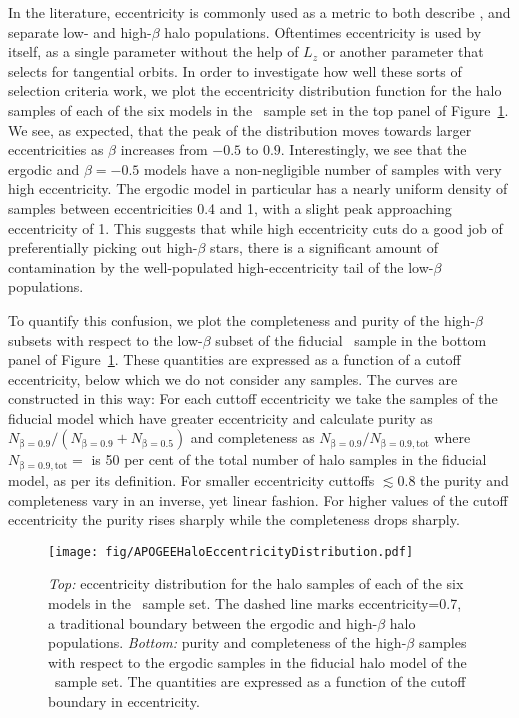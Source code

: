 In the literature, eccentricity is commonly used as a metric to both describe \citep{myeong19,mackereth19a}, and separate \citep{mackereth20,naidu20} low- and high-$\beta$ halo populations. Oftentimes eccentricity is used by itself, as a single parameter without the help of $L_{z}$ or another parameter that selects for tangential orbits. In order to investigate how well these sorts of selection criteria work, we plot the eccentricity distribution function for the halo samples of each of the six models in the \survey\ sample set in the top panel of Figure~\ref{fig:EccentricityDistributions}. We see, as expected, that the peak of the distribution moves towards larger eccentricities as $\beta$ increases from $-0.5$ to $0.9$. Interestingly, we see that the ergodic and $\beta=-0.5$ models have a non-negligible number of samples with very high eccentricity. The ergodic model in particular has a nearly uniform density of samples between eccentricities 0.4 and 1, with a slight peak approaching eccentricity of 1. This suggests that while high eccentricity cuts do a good job of preferentially picking out high-$\beta$ stars, there is a significant amount of contamination by the well-populated high-eccentricity tail of the low-$\beta$ populations.

To quantify this confusion, we plot the completeness and purity of the high-$\beta$ subsets with respect to the low-$\beta$ subset of the fiducial \survey\ sample in the bottom panel of Figure~\ref{fig:EccentricityDistributions}. These quantities are expressed as a function of a cutoff eccentricity, below which we do not consider any samples. The curves are constructed in this way: For each cuttoff eccentricity we take the samples of the fiducial model which have greater eccentricity and calculate purity as $N_\mathrm{\beta=0.9}/(N_\mathrm{\beta=0.9}+N_\mathrm{\beta=0.5})$ and completeness as $N_\mathrm{\beta=0.9}/N_\mathrm{\beta=0.9,tot}$ where $N_\mathrm{\beta=0.9,tot}=$ is 50 per cent of the total number of halo samples in the fiducial model, as per its definition. For smaller eccentricity cuttoffs $\lesssim 0.8$ the purity and completeness vary in an inverse, yet linear fashion. For higher values of the cutoff eccentricity the purity rises sharply while the completeness drops sharply.

\begin{figure}
    \centering
    \texttt{[image: fig/APOGEEHaloEccentricityDistribution.pdf]}
    \caption{\textit{Top:} eccentricity distribution for the halo samples of each of the six models in the \survey\ sample set. The dashed line marks eccentricity=0.7, a traditional boundary between the ergodic and high-$\beta$ halo populations. \textit{Bottom:} purity and completeness of the high-$\beta$ samples with respect to the ergodic samples in the fiducial halo model of the \survey\ sample set. The quantities are expressed as a function of the cutoff boundary in eccentricity.}
    \label{fig:EccentricityDistributions}
\end{figure}

